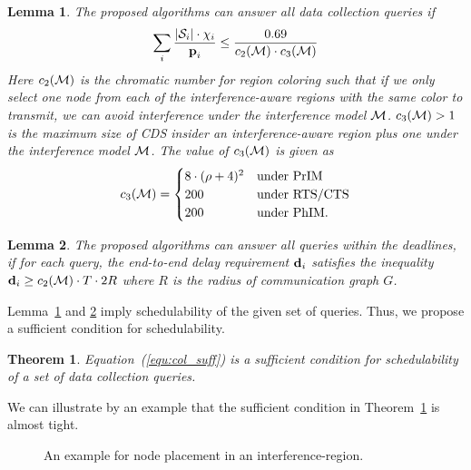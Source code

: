 \documentclass[conference,10pt]{IEEEtran}\usepackage{amsmath}
\newtheorem{boldtheorem}{\textbf{Theorem}}
\newtheorem{lemma}{{Lemma}}
\def\sources{{\cal S}}
\def\processing{{\chi}}
\def\period{{\textbf p}}
\def\delay{{\textbf d}}
\begin{document}
\begin{lemma}\label{lem:col_intime}
The proposed algorithms can answer all
data collection queries if
\begin{eqnarray}\label{equ:col_suff}
\sum_{i}
 \frac{|\sources_i| \cdot \processing_i}{\period_i} \le
 \frac{0.69}{c_2({\cal M})\cdot c_3({\cal M})}
\end{eqnarray}
Here $c_2({\cal M})$ is the chromatic number for region coloring
 such that if we only select
 one node from each of the interference-aware regions with
 the same color to transmit, we can avoid interference under the interference model ${\cal M}$.
$c_3({\cal M}) >1$  is the maximum
size of CDS insider an interference-aware region plus one under the
 interference model ${\cal M}$.
 The value of $c_3({\cal M})$ is given as
\label{lem:c_3}
\begin{equation*}\label{equ:c_3}
c_3({\cal M})=
\begin{cases}
8\cdot(\rho+4)^2  & \text{under PrIM}\\
200  &  \text{under RTS/CTS}\\
200 & \text{under PhIM}.
\end{cases}
\end{equation*}
\end{lemma}

\begin{lemma}\label{lem:col_delay}
The proposed algorithms can answer all
queries within the deadlines,  if for each query, the end-to-end delay
 requirement  $\delay_i$ satisfies the inequality $\delay_i\ge c_2({\cal M})\cdot
T\cdot 2R$ where $R$ is the radius of
communication graph $G$.
\end{lemma}

Lemma~\ref{lem:col_intime} and \ref{lem:col_delay} imply
schedulability of the given set of queries. Thus, we propose a
sufficient condition for schedulability.
\begin{boldtheorem}\label{the:c_3}
Equation~(\ref{equ:col_suff}) is a sufficient condition for
schedulability of a set of data collection queries.
\end{boldtheorem}
We can illustrate by an example
 that the sufficient condition in Theorem~\ref{the:c_3} is almost tight.


 \begin{figure}[h]
\begin{center}
\caption{An example for node placement in an interference-region.}
\label{fig:col bound}
\end{center}
\end{figure}
\end{document}
